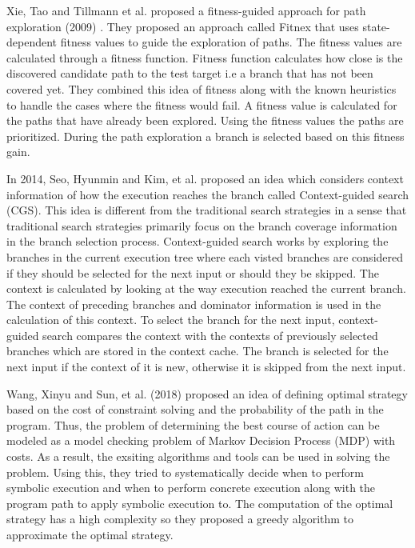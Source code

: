 \documentclass[	runningheads,
				a4paper]{llncs}
\begin{document}
Xie, Tao and Tillmann et al. proposed a fitness-guided approach for path exploration (2009) \cite{xie2009fitness}. They proposed an approach called Fitnex that uses state-dependent fitness values to guide the exploration of paths. The fitness values are calculated through a fitness function. Fitness function calculates how close is the discovered candidate path to the test target i.e a branch that has not been covered yet. They combined this idea of fitness along with the known heuristics to handle the cases where the fitness would fail. A fitness value is calculated for the paths that have already been explored. Using the fitness values the paths are prioritized. During the path exploration a branch is selected based on this fitness gain. 

In 2014, Seo, Hyunmin and Kim, et al. proposed an idea \cite{seo2014we} which considers context information of how the execution reaches the branch called Context-guided search (CGS). This idea is different from the traditional search strategies in a sense that traditional search strategies primarily focus on the branch coverage information in the branch selection process. Context-guided search works by exploring the branches in the current execution tree where each visted branches are considered if they should be selected for the next input or should they be skipped. The context is calculated by looking at the way execution reached the current branch. The context of preceding branches and dominator information is used in the calculation of this context. To select the branch for the next input, context-guided search compares the context with the contexts of previously selected branches which are stored in the context cache. The branch is selected for the next input if the context of it is new, otherwise it is skipped from the next input.

Wang, Xinyu and Sun, et al. (2018) proposed an idea \cite{wang2018towards}  of defining optimal strategy based on the cost of constraint solving and the probability of the path in the program. Thus, the problem of determining the best course of action can be modeled as a model checking problem of Markov Decision Process (MDP) with costs. As a result, the exsiting algorithms and tools can be used in solving the problem. Using this, they tried to  systematically decide when to perform symbolic execution and when to perform concrete execution along with the program path to apply symbolic execution to. 
The computation of the optimal strategy has a high complexity so they proposed a greedy algorithm to approximate the optimal strategy.
\end{document}
